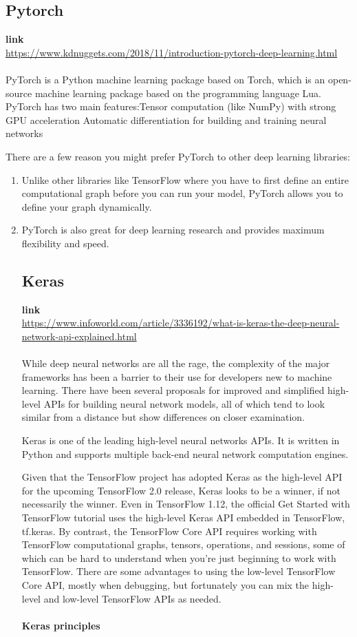 \documentclass[11pt]{article}
\begin{document}
\subsection{Pytorch}
\textbf{link}\\
\url{https://www.kdnuggets.com/2018/11/introduction-pytorch-deep-learning.html}\\\\
PyTorch is a Python machine learning package based on Torch, which is an open-source machine learning package based on the programming language Lua. PyTorch has two main features:Tensor computation (like NumPy) with strong GPU acceleration
    Automatic differentiation for building and training neural networks 
 
There are a few reason you might prefer PyTorch to other deep learning libraries:
\begin{enumerate}
    \item     Unlike other libraries like TensorFlow where you have to first define an entire computational graph before you can run your model, PyTorch allows you to define your graph dynamically.
    \item  PyTorch is also great for deep learning research and provides maximum flexibility and speed. 
    
\subsection{Keras}
\textbf{link}\\
\url{https://www.infoworld.com/article/3336192/what-is-keras-the-deep-neural-network-api-explained.html}\\\\

While deep neural networks are all the rage, the complexity of the major frameworks has been a barrier to their use for developers new to machine learning. There have been several proposals for improved and simplified high-level APIs for building neural network models, all of which tend to look similar from a distance but show differences on closer examination.

Keras is one of the leading high-level neural networks APIs. It is written in Python and supports multiple back-end neural network computation engines.


Given that the TensorFlow project has adopted Keras as the high-level API for the upcoming TensorFlow 2.0 release, Keras looks to be a winner, if not necessarily the winner.
Even in TensorFlow 1.12, the official Get Started with TensorFlow tutorial uses the high-level Keras API embedded in TensorFlow, tf.keras. By contrast, the TensorFlow Core API requires working with TensorFlow computational graphs, tensors, operations, and sessions, some of which can be hard to understand when you're just beginning to work with TensorFlow. There are some advantages to using the low-level TensorFlow Core API, mostly when debugging, but fortunately you can mix the high-level and low-level TensorFlow APIs as needed.\\\\
\textbf{Keras principles}


\end{enumerate}
\end{document}
